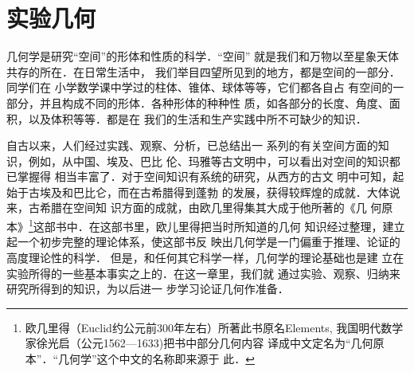 \chapter{实验几何}

几何学是研究“空间”的形体和性质的科学．“空间”
就是我们和万物以至星象天体共存的所在．在日常生活中，
我们举目四望所见到的地方，都是空间的一部分．同学们在
小学数学课中学过的柱体、锥体、球体等等，它们都各自占
有空间的一部分，并且构成不同的形体．各种形体的种种性
质，如各部分的长度、角度、面积，以及体积等等．都是在
我们的生活和生产实践中所不可缺少的知识．
\begin{figure}[htp]
	\centering
{}	
	\caption{}
\end{figure}

自古以来，人们经过实践、观察、分析，已总结出一
系列的有关空间方面的知识，例如，从中国、埃及、巴比
伦、玛雅等古文明中，可以看出对空间的知识都已掌握得
相当丰富了．对于空间知识有系统的研究，从西方的古文
明中可知，起始于古埃及和巴比仑，而在古希腊得到蓬勃
的发展，获得较辉煌的成就．大体说来，古希腊在空间知
识方面的成就，由欧几里得集其大成于他所著的《几
何原
本》\footnote{欧几里得（Euclid约公元前300年左右）所著此书原名Elements, 
	我国明代数学家徐光启（公元1562---1633)把书中部分几何内容
	译成中文定名为“几何原本”．“几何学”这个中文的名称即来源于
	此．}这部书中．在这部书里，欧儿里得把当时所知道的几何
知识经过整理，建立起一个初步完整的理论体系，使这部书反
映出几何学是一门偏重于推理、论证的高度理论性的科学．
但是，和任何其它科学一样，几何学的理论基础也是建
立在实验所得的一些基本事实之上的．在这一章里，我们就
通过实验、观察、归纳来研究所得到的知识，为以后进一
步学习论证几何作准备．

